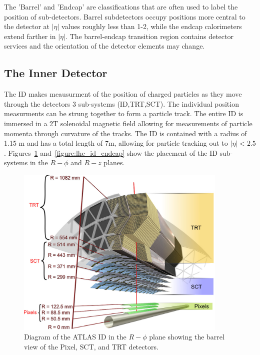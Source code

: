 The 'Barrel' and 'Endcap' are classifications that are often used to label the position of sub-detectors. Barrel subdetectors occupy positions more central to the detector at $|\eta|$ values roughly less than 1-2, while the endcap calorimeters extend farther in $|\eta|$. The barrel-endcap transition region contains detector services and the orientation of the detector elements may change. 

\subsection{The Inner Detector}

The ID makes meausurment of the position of charged particles as they move through the detectors 3 sub-systems (ID,TRT,SCT). The individual position measurments can be strung together to form a particle track. The entire ID is immersed in a 2T solenoidal magnetic field allowing for measurements of particle momenta through curvature of the tracks. The ID is contained with a radius of 1.15 m and has a total length of 7m, allowing for particle tracking out to $|\eta| < 2.5$ . Figures~\ref{figure:lhc_id_barrel} and~\ref{figure:lhc_id_endcap} show the placement of the ID sub-systems in the $R-\phi$ and $R-z$ planes.  


\begin{figure}[!t]
\centering 
\includegraphics[width=0.9\textwidth]{figs/lhc/IDBarrel-eps-converted-to}
\caption{ Diagram of the ATLAS ID in the $R-\phi$ plane showing the barrel view of the Pixel, SCT, and TRT detectors.
}
\label{figure:lhc_id_barrel}
\end{figure}

